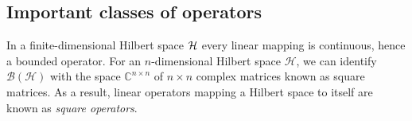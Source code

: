  

\subsection{Important classes of operators}

 In a finite-dimensional Hilbert space $\mathcal{H}$ every linear mapping is continuous, hence a bounded operator. 
For an $n$-dimensional Hilbert space $\mathcal{H}$, we can identify $\mathcal{B}(\mathcal{H})$ with the space $\mathbb{C}^{n\times n}$ of $n \times n$ complex matrices known as square matrices. As a result, linear operators mapping a Hilbert space to itself are known as \emph{square operators}. %


